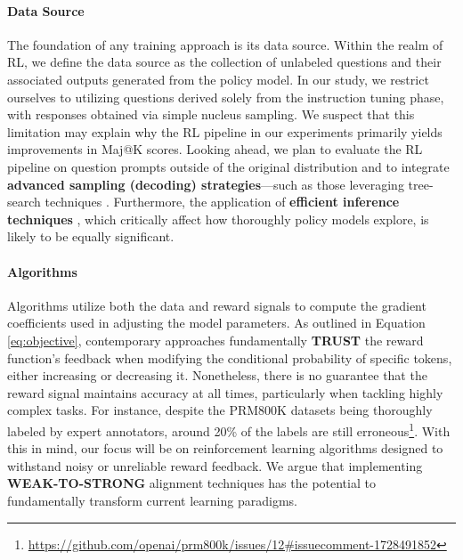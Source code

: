 \begin{itemize}[topsep=0pt]
\begin{itemize}[topsep=0pt]
\paragraph{Data Source} The foundation of any training approach is its data source. Within the realm of RL, we define the data source as the collection of unlabeled questions and their associated outputs generated from the policy model. In our study, we restrict ourselves to utilizing questions derived solely from the instruction tuning phase, with responses obtained via simple nucleus sampling. We suspect that this limitation may explain why the RL pipeline in our experiments primarily yields improvements in Maj@K scores. Looking ahead, we plan to evaluate the RL pipeline on question prompts outside of the original distribution and to integrate \textbf{advanced sampling (decoding) strategies}—such as those leveraging tree-search techniques \citep{yao2023tree}. Furthermore, the application of \textbf{efficient inference techniques} \citep{xia-etal-2023-speculative,leviathan2023fast,kwon2023efficient,xia2024unlocking}, which critically affect how thoroughly policy models explore, is likely to be equally significant.

\paragraph{Algorithms} Algorithms utilize both the data and reward signals to compute the gradient coefficients used in adjusting the model parameters. As outlined in Equation \ref{eq:objective}, contemporary approaches fundamentally \textbf{TRUST} the reward function’s feedback when modifying the conditional probability of specific tokens, either increasing or decreasing it. Nonetheless, there is no guarantee that the reward signal maintains accuracy at all times, particularly when tackling highly complex tasks. For instance, despite the PRM800K datasets \citep{lightman2023let} being thoroughly labeled by expert annotators, around 20\% of the labels are still erroneous\footnote{\url{https://github.com/openai/prm800k/issues/12\#issuecomment-1728491852}}. With this in mind, our focus will be on reinforcement learning algorithms designed to withstand noisy or unreliable reward feedback. We argue that implementing \textbf{WEAK-TO-STRONG} \citep{burns2023weak} alignment techniques has the potential to fundamentally transform current learning paradigms.


\end{itemize}
\end{itemize}
